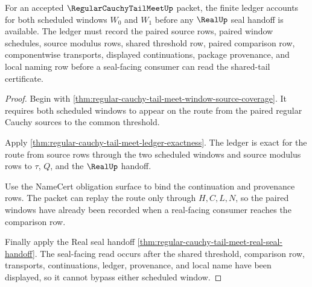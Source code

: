 \begin{theorem}
\label{thm:regular-cauchy-tail-meet-paired-window-ledger-coverage}
For an accepted $\RegularCauchyTailMeetUp$ packet, the finite ledger accounts for both scheduled windows $W_0$ and $W_1$ before any $\RealUp$ seal handoff is available. The ledger must record the paired source rows, paired window schedules, source modulus rows, shared threshold row, paired comparison row, componentwise transports, displayed continuations, package provenance, and local naming row before a seal-facing consumer can read the shared-tail certificate.
\end{theorem}
\begin{proof}
Begin with \autoref{thm:regular-cauchy-tail-meet-window-source-coverage}. It requires both scheduled windows to appear on the route from the paired regular Cauchy sources to the common threshold.

Apply \autoref{thm:regular-cauchy-tail-meet-ledger-exactness}. The ledger is exact for the route from source rows through the two scheduled windows and source modulus rows to $\tau$, $Q$, and the $\RealUp$ handoff.

Use the NameCert obligation surface to bind the continuation and provenance rows. The packet can replay the route only through $H,C,L,N$, so the paired windows have already been recorded when a real-facing consumer reaches the comparison row.

Finally apply the Real seal handoff \autoref{thm:regular-cauchy-tail-meet-real-seal-handoff}. The seal-facing read occurs after the shared threshold, comparison row, transports, continuations, ledger, provenance, and local name have been displayed, so it cannot bypass either scheduled window.
\end{proof}

